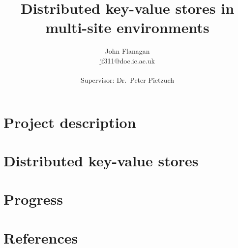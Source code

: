\documentclass[a4paper,11pt]{article}
\title{Distributed key-value stores in multi-site environments}
\author{John Flanagan \\ jf311@doc.ic.ac.uk\\ \\
       \small{Supervisor: Dr.\ Peter Pietzuch}\\
}
\begin{document}
\maketitle
\pagebreak
\tableofcontents
\pagebreak

\section{Project description}
	

\pagebreak
\section{Distributed key-value stores}
	


\pagebreak
\section{Progress}
	

\pagebreak	
\section{References}
	\vspace{-20pt}
	\def\refname{}
	
	
\end{document}
